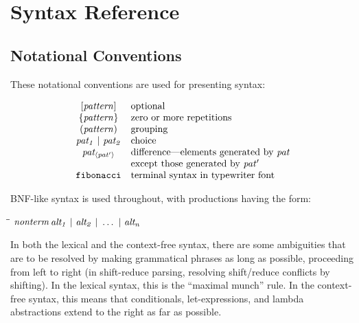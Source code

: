 %
%
\chapter{Syntax Reference}
\label{syntax}

\section{Notational Conventions}

These notational conventions are used for presenting syntax:

\[\ba{cl}
\mbox{$\it [pattern]$}             & \tr{optional} \\
\mbox{$\it \{pattern\}$}           & \tr{zero or more repetitions} \\
\mbox{$\it (pattern)$}             & \tr{grouping} \\
\mbox{$\it pat_1\ |\ pat_2$}         & \tr{choice} \\
\mbox{$\it pat_{\langle{}pat'\rangle{}}$}  & \tr{difference---elements generated by \mbox{$\it pat$}} \\
                        & \tr{except those generated by \mbox{$\it pat'$}} \\
\mbox{$\it \makebox{\tt fibonacci}$}           & \tr{terminal syntax in typewriter font}
\ea\]

BNF-like syntax is used throughout, with productions having the form:
\begin{flushleft}\it\begin{tabbing}
\hspace{0.6in}\=\hspace{3.1in}\=\kill
$\it nonterm$\>\makebox[3.5em]{$\rightarrow$}$\it alt_1\ |\ alt_2\ |\ \ldots \ |\ alt_n$
\end{tabbing}\end{flushleft}

In both the lexical and the context-free syntax, there are some
ambiguities that are to be resolved by making grammatical phrases as
long as possible, proceeding from left to right (in shift-reduce
parsing, resolving shift/reduce conflicts by shifting).  In the lexical
syntax, this is the ``maximal munch'' rule.  In the
context-free syntax, this means that conditionals, let-expressions, and
lambda abstractions extend to the right as far as possible.

